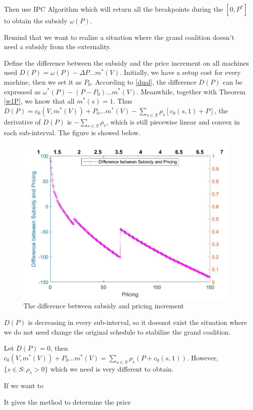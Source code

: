 Then use IPC Algorithm which will return all the breakpoints during the $[0, P^*]$ to obtain the subsidy $\omega(P)$.

Remind that we want to realize a situation where the grand coalition doesn't need a subsidy from the externality.

Define the difference between the subsidy and the price increment on all machines used $D(P) = \omega(P) - \Delta P\dots m^*(V)$. Initially, we have a setup cost for every machine, then we set it as $P_0$.
According to \ref{dual}, the difference $D(P)$ can be expressed as $\omega^*(P) - (P-P_0)\dots m^*(V)$. Meanwhile, together with Theorem \ref{w1P}, we know that all $m^*(s) =1$. Thus $D(P) = c_0(V, m^*(V)) + P_0 \dots m^*(V) - \sum_{s\in S}\rho_s[c_0(s, 1) + P]$, the derivative of $D(P)$ is $-\sum_{s\in S}\rho_s$, which is still piecewise linear and convex in each sub-interval.
The figure is showed below.
\begin{figure}[h]%
	\centering  %
	\includegraphics[width=0.8\linewidth]{Figures/Imagediff}  %
	\caption{The difference between subsidy and pricing increment}  %
	\label{fig:Imagediff}   %
\end{figure}

$D(P)$ is decreasing in every sub-interval, so it doesnot exist the situation where we do not need change the original schedule to stabilize the grand coalition.

Let $D(P) = 0$, then $c_0(V, m^*(V)) + P_0 \dots m^*(V) = \sum_{s \in S} \rho_s (P + c_0(s,1))$. However, $\{s\in S: \rho_s > 0\}$ which we need is very different to obtain.

If we want to

It gives the method to determine the price

